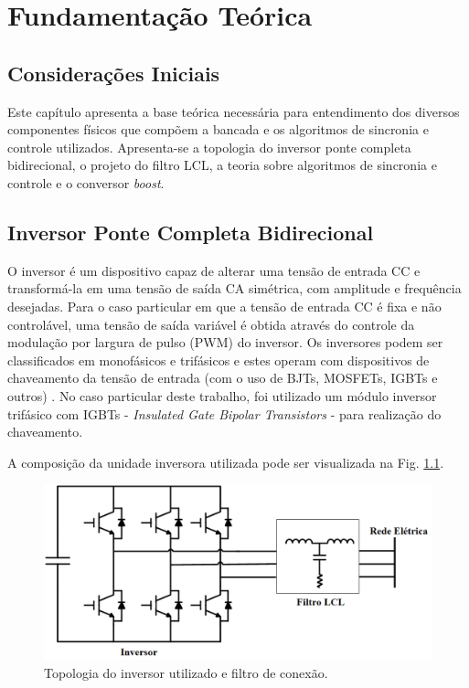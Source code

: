 \chapter{Fundamentação Teórica}

\section{Considerações Iniciais}

Este capítulo apresenta a base teórica necessária para entendimento dos diversos componentes físicos 
que compõem a bancada e os algoritmos de sincronia e controle utilizados.
Apresenta-se a topologia do inversor ponte completa bidirecional, o projeto do filtro LCL, a teoria sobre algoritmos de sincronia e controle e o conversor \textit{boost}.

\section{Inversor Ponte Completa Bidirecional}

O inversor é um dispositivo capaz de alterar uma tensão de entrada CC e transformá-la em uma tensão de saída CA simétrica, com amplitude e frequência desejadas. Para o caso particular em que a tensão de entrada CC é fixa e não controlável, uma tensão de saída variável é obtida através do controle da modulação por largura de pulso (PWM) do inversor. Os inversores podem ser classificados em monofásicos e trifásicos e estes operam com dispositivos de chaveamento da tensão de entrada (com o uso de BJTs, MOSFETs, IGBTs e outros) \cite{MRashid}. No caso particular deste trabalho, foi utilizado um módulo inversor trifásico com IGBTs - \textit{Insulated Gate Bipolar Transistors} - para realização do chaveamento. 

A composição da unidade inversora utilizada pode ser visualizada na Fig. \ref{fig:Inversor}.

\begin{figure}[!hbt]
	\begin{center}
		\includegraphics[scale=0.45]{figuras/Inversor.png}
		\caption{Topologia do inversor utilizado e filtro de conexão.}
		\label{fig:Inversor}
	\end{center}
\end{figure}


